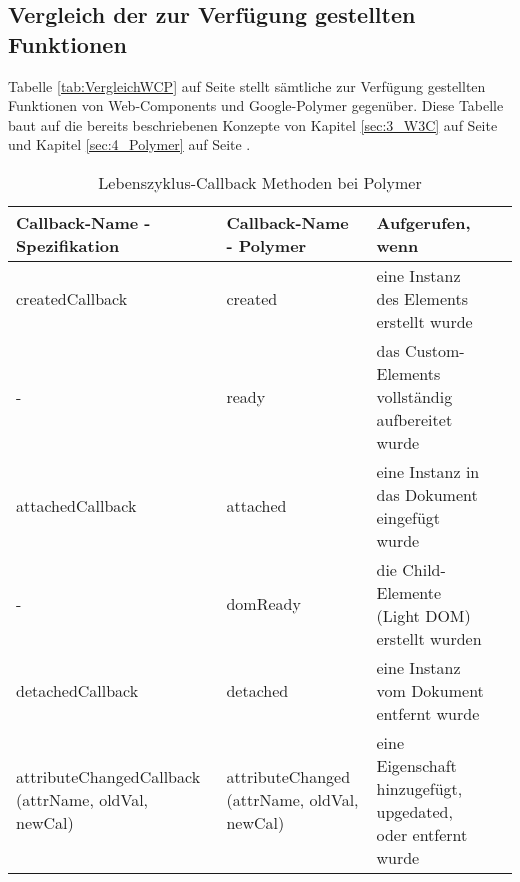 \subsection{Vergleich der zur Verfügung gestellten Funktionen}
Tabelle \ref{tab:VergleichWCP} auf Seite \pageref{tab:VergleichWCP} stellt sämtliche zur Verfügung gestellten Funktionen von Web-Components und Google-Polymer gegenüber. Diese Tabelle baut auf die bereits beschriebenen Konzepte von Kapitel \ref{sec:3_W3C} auf Seite \pageref{sec:3_W3C} und Kapitel \ref{sec:4_Polymer} auf Seite \pageref{sec:4_Polymer}.

\begin{table}[htbp]
\centering
\begin{tabular}{ M{4cm} | M{4cm} | M{4cm} N}
Callback-Name - Spezifikation & Callback-Name - Polymer &Aufgerufen, wenn &\\[4ex]
\hline
\hline
createdCallback & created & eine Instanz des Elements erstellt wurde&\\[4ex]
\hline
- & ready & das Custom-Elements vollständig aufbereitet wurde&\\[4ex]
\hline
attachedCallback & attached & eine Instanz in das Dokument eingefügt wurde&\\[4ex]
\hline
- & domReady & die Child-Elemente (Light DOM) erstellt wurden&\\[4ex]
\hline
detachedCallback & detached & eine Instanz vom Dokument entfernt wurde&\\[4ex]
\hline
attributeChangedCallback (attrName, oldVal, newCal) & attributeChanged (attrName, oldVal, newCal) & eine Eigenschaft hinzugefügt, upgedated, oder entfernt wurde&\\[4ex]
\end{tabular}
\caption[
Lebenszyklus-Callback Methoden bei Polymer
]
{Lebenszyklus-Callback Methoden bei Polymer}
\label{tab:Lifecycle_Callback_Methoden_Polymer2}
\end{table}


